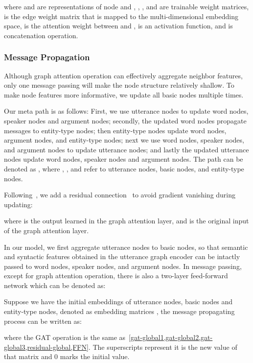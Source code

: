 \documentclass[letterpaper]{article} \usepackage{aaai21}  \usepackage{times}  \usepackage{helvet} \usepackage{courier}  \usepackage[hyphens]{url}  \usepackage{graphicx} \urlstyle{rm} \def\UrlFont{\rm}  \usepackage{natbib}  \usepackage{caption} \frenchspacing  \setlength{\pdfpagewidth}{8.5in}  \setlength{\pdfpageheight}{11in}
\begin{document}
where  and  are representations of node  and , , ,  and  are trainable weight matrices,  is the edge weight matrix that is mapped to the multi-dimensional embedding space,  is the attention weight between  and ,  is an activation function, and  is concatenation operation.

\subsubsection{Message Propagation}
Although graph attention operation can effectively aggregate neighbor features, only one message passing will make the node structure relatively shallow. To make node features more informative, we update all basic nodes multiple times.

Our meta path is as follows:
First, we use utterance nodes to update word nodes, speaker nodes and argument nodes; secondly, the updated word nodes propagate messages to entity-type nodes; then entity-type nodes update word nodes, argument nodes, and entity-type nodes; next we use word nodes, speaker nodes, and argument nodes to update utterance nodes; and lastly the updated utterance nodes update word nodes, speaker nodes and argument nodes. The path can be denoted as , where , , and  refer to utterance nodes, basic nodes, and entity-type nodes.

Following~\citet{wang2020heterogeneous}, we add a residual connection~\cite{he2016deep} to avoid gradient vanishing during updating:


where  is the output learned in the graph attention layer, and  is the original input of the graph attention layer.

In our model, we first aggregate utterance nodes to basic nodes, so that semantic and syntactic features obtained in the utterance graph encoder can be intactly passed to word nodes, speaker nodes, and argument nodes. In message passing, except for graph attention operation, there is also a two-layer feed-forward network which can be denoted as:


Suppose we have the initial embeddings of utterance nodes, basic nodes and entity-type nodes, denoted as embedding matrices , the message propagating process can be written as:





where the GAT operation is the same as~\cref{gat-global1,gat-global2,gat-global3,residual-global,FFN}. The superscripts represent it is the  new value of that matrix and 0 marks the initial value.
\end{document}
